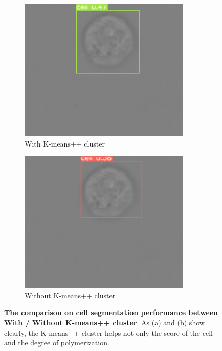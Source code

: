 \begin{figure}[h]
\begin{center}
		\begin{subfigure}[b]{0.49\textwidth}
		    \centering
			\includegraphics[width=0.9\textwidth]{thesis-template-master/images/withkmean1.png}
			\caption{With K-means++ cluster}
			\label{fig:cellnet}
		\end{subfigure}
		\begin{subfigure}[b]{0.49\textwidth}
		    \centering
			\includegraphics[width=0.9\textwidth]{thesis-template-master/images/withoutkmean2.png}
			\caption{Without K-means++ cluster}
			\label{fig:cellnet}
		\end{subfigure}
	\end{center}
	\caption{\textbf{The comparison on cell segmentation  performance between With / Without K-means++ cluster}. As (a) and (b) show clearly, the K-means++ cluster helps not only the score of the cell  and the degree of polymerization. }
\end{figure}


